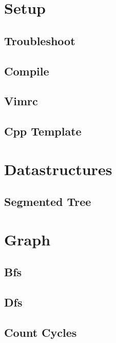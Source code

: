 \section{Setup}
\subsection{Troubleshoot}
\raggedbottom
\hrulefill
\subsection{Compile}
\raggedbottom
\hrulefill
\subsection{Vimrc}
\raggedbottom
\hrulefill
\subsection{Cpp Template}
\raggedbottom
\hrulefill

\section{Datastructures}
\subsection{Segmented Tree}
\raggedbottom
\hrulefill

\section{Graph}
\subsection{Bfs}
\raggedbottom
\hrulefill
\subsection{Dfs}
\raggedbottom
\hrulefill
\subsection{Count Cycles}
\raggedbottom
\hrulefill
